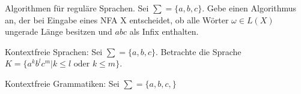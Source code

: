 \documentclass[10pt, a4paper]{exam}
\begin{document}
\begin{questions}
\begin{parts}
\begin{solution}
    \end{solution}
  \end{parts}

  \question Algorithmen für reguläre Sprachen. Sei $\sum=\{a,b,c\}$. Gebe einen Algorithmus an, der bei Eingabe eines NFA X entscheidet, ob alle Wörter $\omega\in L(X)$ ungerade Länge besitzen und $abc$ als Infix enthalten.
  \begin{solution}
  \end{solution}

  \question Kontextfreie Sprachen: Sei $\sum=\{a,b,c\}$. Betrachte die Sprache $K=\{a^k b^l c^m|k\leq l \text{ oder } k\leq m\}$.

  \question Kontextfreie Grammatiken: Sei $\sum=\{a,b,c,\}$
  \begin{parts}

\end{parts}
\end{questions}
\end{document}
